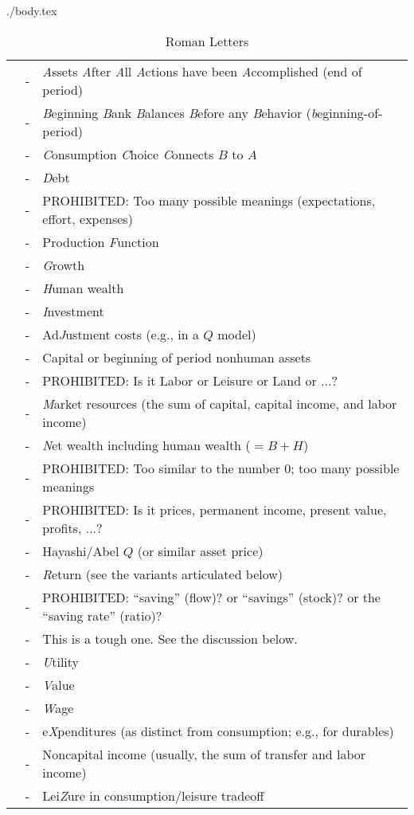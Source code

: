 \documentclass{econtex}
\begin{document}
\begin{verbatimwrite}{./body.tex}
\begin{table}[h]
\begin{center}
\begin{tabular}{lcl} \\
    \ALev & - & {\it A}ssets {\it A}fter {\it A}ll {\it A}ctions have been {\it A}ccomplished (end of period)
\\  \BLev & - & {\it B}eginning {\it B}ank {\it B}alances {\it B}efore any {\it B}ehavior ({\it b}eginning-of-period)
\\  \CLev & - & {\it C}onsumption {\it C}hoice {\it C}onnects $B$ to $A$
\\  \DLev & - & {\it D}ebt
\\  \ELev & - & PROHIBITED:  Too many possible meanings (expectations, effort, expenses)
\\  \FLev & - & Production {\it F}unction
\\  \GLev & - & {\it G}rowth 
\\  \HLev & - & {\it H}uman wealth
\\  \ILev & - & {\it I}nvestment
\\  \JLev & - & Ad{\it J}ustment costs (e.g., in a $Q$ model)
\\  \KLev & - & Capital or beginning of period nonhuman assets
\\  \LLev & - & PROHIBITED: Is it Labor or Leisure or Land or ...?
\\  \MLev & - & {\it M}arket resources (the sum of capital, capital income, and labor income)
\\  \NLev & - & {\it N}et wealth including human wealth ($=B + H$)
\\  \OLev & - & PROHIBITED: Too similar to the number 0; too many possible meanings
\\  \PLev & - & PROHIBITED: Is it prices, permanent income, present value, profits, ...?
\\  \QLev & - & Hayashi/Abel $Q$ (or similar asset price)
\\  \RLev & - & {\it R}eturn (see the variants articulated below)
\\  \SLev & - & PROHIBITED: ``saving'' (flow)? or ``savings'' (stock)? or the ``saving rate'' (ratio)?
\\  \TLev & - & This is a tough one.  See the discussion below.
\\  \ULev & - & {\it U}tility
\\  \VLev & - & {\it V}alue
\\  \WLev & - & {\it W}age
\\  \XLev & - & e{\it X}penditures (as distinct from consumption; e.g., for durables)
\\  \YLev & - & Noncapital income (usually, the sum of transfer and labor income)
\\  \ZLev & - & Lei{\it Z}ure in consumption/leisure tradeoff
\end{tabular}
\end{center}
\caption{Roman Letters}
\label{table:RomanLetters}
\end{table}


\end{verbatimwrite}
\end{document}
